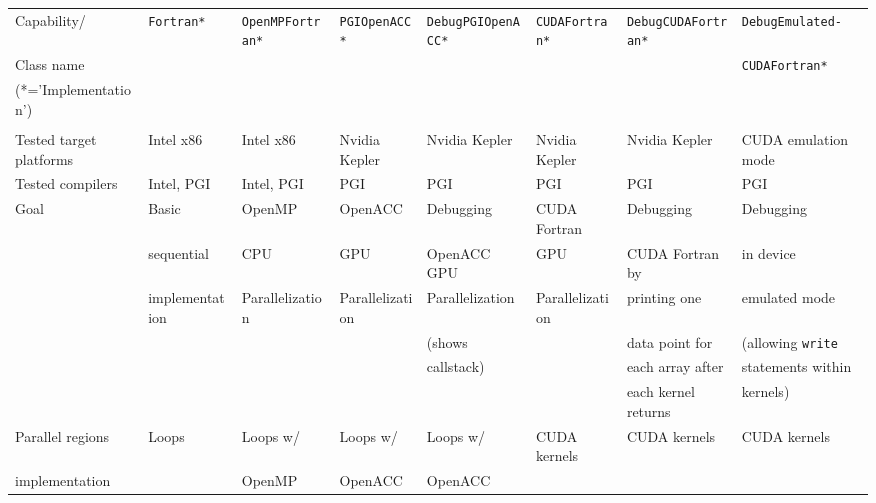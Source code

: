 \tabcolsep=0.11cm
\begin{table}
        \centering
        \footnotesize
        \begin{tabular}{lllllll}
                Capability/ & \verb|Fortran*| & \verb|OpenMPFortran*| & \verb|PGIOpenACC*| & \verb|DebugPGIOpenACC*| & \verb|CUDAFortran*| & \verb|DebugCUDAFortran*| & \verb|DebugEmulated-| \\
                Class name & & & & & & & \verb|CUDAFortran*| \\
                (*='Implementation') & & & & & & & \\
                \\
                \hline \hline
                Tested target platforms & Intel x86 & Intel x86 & Nvidia Kepler & Nvidia Kepler & Nvidia Kepler & Nvidia Kepler & CUDA emulation mode \\
                \hline
                Tested compilers & Intel, PGI & Intel, PGI & PGI & PGI & PGI & PGI & PGI \\
                \hline
                Goal & Basic          & OpenMP          & OpenACC          & Debugging       & CUDA Fortran        & Debugging             & Debugging                         \\
                     & sequential     & CPU             & GPU              & OpenACC GPU     & GPU                 & CUDA Fortran by       & in device                         \\
                     & implementation & Parallelization & Parallelization  & Parallelization & Parallelization     & printing one          & emulated mode                     \\
                     &                &                 &                  & (shows          &                     & data point for        & (allowing \verb|write|            \\
                     &                &                 &                  &  callstack)     &                     & each array after      & statements within                 \\
                     &                &                 &                  &                 &                     & each kernel returns   & kernels)                          \\
                \hline
                Parallel regions & Loops & Loops w/ & Loops w/ & Loops w/ & CUDA kernels & CUDA kernels & CUDA kernels \\
                implementation & & OpenMP & OpenACC & OpenACC & & & \\

\end{tabular}
\end{table}
